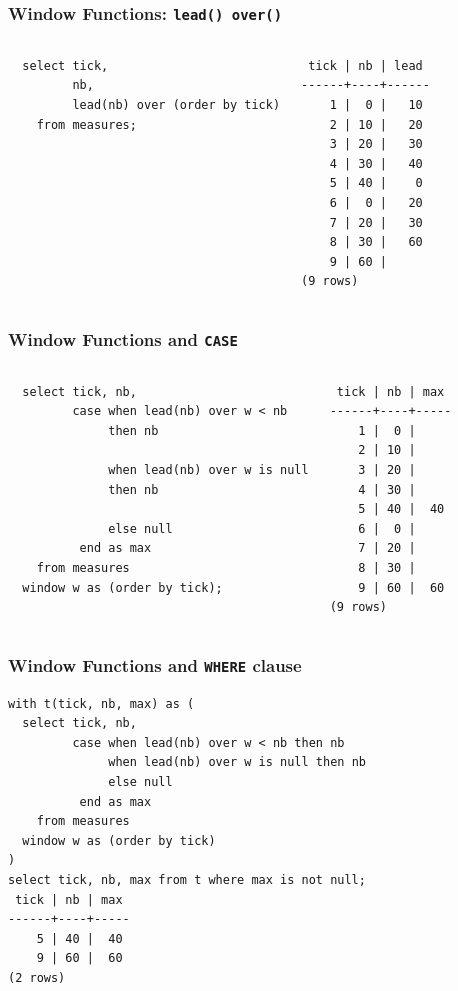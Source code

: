 \documentclass{beamer}
\begin{document}
\begin{frame}[fragile]
  \frametitle{Window Functions: \texttt{lead() over()}}

\begin{columns}
\begin{verbatim}
  select tick,
         nb,
         lead(nb) over (order by tick)
    from measures;
\end{verbatim}

\begin{verbatim}
 tick | nb | lead 
------+----+------
    1 |  0 |   10
    2 | 10 |   20
    3 | 20 |   30
    4 | 30 |   40
    5 | 40 |    0
    6 |  0 |   20
    7 | 20 |   30
    8 | 30 |   60
    9 | 60 |     
(9 rows)
\end{verbatim}
\end{columns}
\end{frame}

\begin{frame}[fragile]
  \frametitle{Window Functions and \texttt{CASE}}

\begin{columns}
\begin{verbatim}
  select tick, nb,
         case when lead(nb) over w < nb
              then nb

              when lead(nb) over w is null
              then nb

              else null
          end as max
    from measures
  window w as (order by tick);
\end{verbatim}
\begin{verbatim}
 tick | nb | max 
------+----+-----
    1 |  0 |    
    2 | 10 |    
    3 | 20 |    
    4 | 30 |    
    5 | 40 |  40
    6 |  0 |    
    7 | 20 |    
    8 | 30 |    
    9 | 60 |  60
(9 rows)
\end{verbatim}
\end{columns}
\end{frame}

\begin{frame}[fragile]
  \frametitle{Window Functions and \texttt{WHERE} clause}

\begin{verbatim}
with t(tick, nb, max) as (
  select tick, nb,
         case when lead(nb) over w < nb then nb
              when lead(nb) over w is null then nb
              else null
          end as max
    from measures
  window w as (order by tick)
)
select tick, nb, max from t where max is not null;
 tick | nb | max 
------+----+-----
    5 | 40 |  40
    9 | 60 |  60
(2 rows)
\end{verbatim}
\end{frame}
\end{document}
